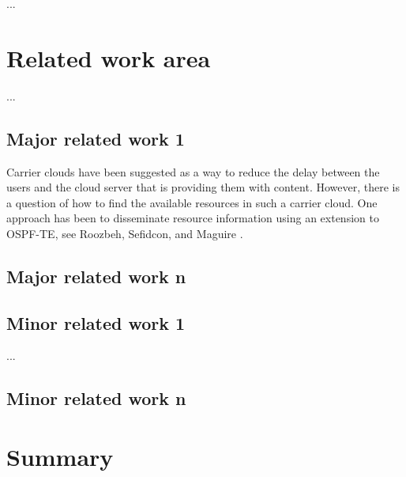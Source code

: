 ...

\section{Related work area}


...


\subsection{Major related work 1}

Carrier clouds have been suggested as a way to reduce the delay between the users and the cloud server that is providing them with content. However, there is a question of how to find the available resources in such a carrier cloud. One approach has been to disseminate resource information using an extension to OSPF-TE, see Roozbeh, Sefidcon, and Maguire \cite{roozbeh_resource_2013}.

\subsection{Major related work n}

\subsection{Minor related work 1}

...

\subsection{Minor related work n}

\section{Summary}



\cleardoublepage

